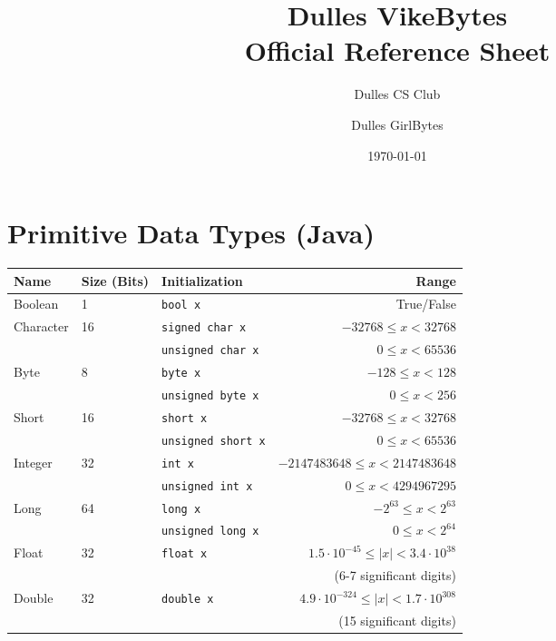 \documentclass{article}
\title{Dulles VikeBytes\\Official Reference Sheet}
\date{\today}
\author{Dulles CS Club \and Dulles GirlBytes}
\begin{document}

{\let\newpage\relax\maketitle} %

\renewcommand{\arraystretch}{1.25} %
\section{Primitive Data Types (Java)}
\begin{center}\begin{tabular}{lllr}\toprule
  Name      &Size (Bits) &Initialization              &Range \\\midrule
  Boolean   &1           &\lstinline|bool x|          &True/False \\\midrule
  Character &16          &\lstinline|signed char x|   &\(-32768 \leq x < 32768\) \\ 
            &            &\lstinline|unsigned char x| &\(0 \leq x < 65536\) \\
  Byte      &8           &\lstinline|byte x|          &\(-128 \leq x < 128\) \\
            &            &\lstinline|unsigned byte x| &\(0 \leq x < 256\) \\
  Short     &16          &\lstinline|short x|         &\(-32768 \leq x < 32768\) \\
            &            &\lstinline|unsigned short x|&\(0 \leq x < 65536\) \\
  Integer   &32          &\lstinline|int x|           &\(-2147483648 \leq x < 2147483648\) \\
            &            &\lstinline|unsigned int x|  &\(0 \leq x < 4294967295\) \\
  Long      &64          &\lstinline|long x|          &\(-2^{63} \leq x < 2^{63}\) \\
            &            &\lstinline|unsigned long x| &\(0 \leq x < 2^{64}\) \\\midrule
  Float     &32          &\lstinline|float x|         &\(1.5\cdot10^{-45} \leq |x| < 3.4\cdot10^{38}\) \\
            &            &                            &(6-7 significant digits) \\
  Double    &32          &\lstinline|double x|        &\(4.9\cdot10^{-324} \leq |x| < 1.7\cdot10^{308}\) \\
            &            &                            &(15 significant digits) \\
\bottomrule\end{tabular}\end{center}
\end{document}
